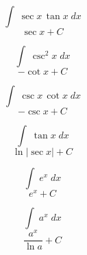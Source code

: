 \documentclass[avery5371,grid]{flashcards}
\begin{document}
\begin{flashcard}{\large \vspace*{\fill} \[ \int\; \sec x \, \tan x \;dx \] \vspace*{\fill}   }{\large \vspace*{\fill} \[ \sec x + C  \] \vspace*{\fill}   }\end{flashcard}

\begin{flashcard}{\large \vspace*{\fill} \[ \int\; \csc^2 x \;dx \] \vspace*{\fill}   }{\large \vspace*{\fill} \[ -\cot x + C  \] \vspace*{\fill}   }\end{flashcard}

\begin{flashcard}{\large \vspace*{\fill} \[ \int\; \csc x \, \cot x \;dx \] \vspace*{\fill}   }{\large \vspace*{\fill} \[ -\csc x + C  \] \vspace*{\fill}   }\end{flashcard}

\begin{flashcard}{\large \vspace*{\fill} \[ \int\; \tan x \;dx \] \vspace*{\fill}   }{\large \vspace*{\fill} \[ \ln|\sec x| + C   \] \vspace*{\fill}   }\end{flashcard}




\begin{flashcard}{\large \vspace*{\fill} \[ \int\; e^x \;dx \] \vspace*{\fill}   }{\large \vspace*{\fill} \[ e^x + C  \] \vspace*{\fill}   }\end{flashcard}

\begin{flashcard}{\large \vspace*{\fill} \[ \int\; a^x \;dx \] \vspace*{\fill}   }{\large \vspace*{\fill} \[ \dfrac{a^x}{\ln a} + C  \] \vspace*{\fill}   }\end{flashcard}
\end{document}
